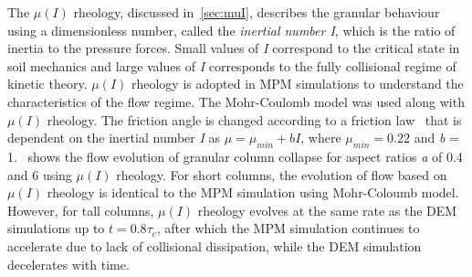 The $\mu(I)$ rheology, discussed in~\cref{sec:muI}, describes the granular 
behaviour using a dimensionless number, called the \textit{inertial number I}, 
which is the ratio of inertia to the pressure forces. Small values of 
\textit{I} correspond to the critical state in soil mechanics and large values 
of \textit{I} corresponds to the fully collisional regime of kinetic theory. 
$\mu(I)$ rheology is adopted in MPM simulations to understand the 
characteristics of the flow regime. The Mohr-Coulomb model was used along with 
$\mu(I)$ rheology. The friction angle is changed according to a friction 
law~\citep{DaCruz2005} that is dependent on the inertial number \textit{I} as 
$\mu = \mu_{min} + b \mathit{I}$, where $\mu_{min} = 0.22$ and \textit{b} = 
1.~ shows the flow evolution of granular column collapse for 
aspect ratios \textit{a} of 0.4 and 6 using $\mu(I)$ rheology. For short 
columns, the evolution of flow based on $\mu(I)$ rheology is identical to the 
MPM simulation using Mohr-Coloumb model. However, for tall columns, $\mu(I)$ 
rheology evolves at the same rate as the DEM simulations up to $t = 0.8\tau_c$, 
after which the MPM simulation continues to accelerate due to lack of 
collisional dissipation, while the DEM simulation decelerates with time. 

